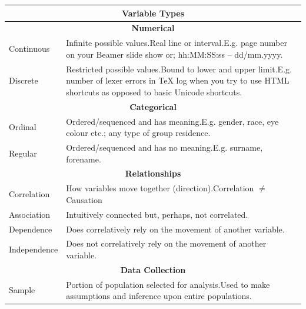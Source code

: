 \documentclass[11pt, english]{article}
\begin{document}
	\begin{center}
                \scriptsize
        \begin{longtable}{p{3cm}p{9cm}}
                \hline
                \hline
	       	\multicolumn{2}{c}{\textbf{Variable Types}}\\
                \hline
                \hline
                \multicolumn{2}{c}{\textbf{Numerical}}\\
                \hline
                Continuous & Infinite possible values.\newline Real line or interval.\newline E.g. page number on your Beamer slide show or; hh:MM:SS:ss -- dd/mm.yyyy.\\
                Discrete & Restricted possible values.\newline Bound to lower and upper limit.\newline E.g. number of lexer errors in {\TeX} log when you try to use HTML shortcuts as opposed to basic Unicode shortcuts.\\
                \hline
                \multicolumn{2}{c}{\textbf{Categorical}}\\
                \hline
                Ordinal & Ordered/sequenced and has meaning.\newline E.g. gender, race, eye colour etc.; any type of group residence.\\
                Regular & Ordered/sequenced and has no meaning.\newline E.g. surname, forename.\\
                \hline
                \multicolumn{2}{c}{\textbf{Relationships}}\\
                \hline
                Correlation & How variables move together (direction).\newline Correlation $\neq$ Causation\\
                Association & Intuitively connected but, perhaps, not correlated.\\
                Dependence & Does correlatively rely on the movement of another variable.\\
                Independence & Does not correlatively rely on the movement of another variable.\\
                \hline
                \hline
                \multicolumn{2}{c}{\textbf{Data Collection}}\\
                \hline
                \hline
                Sample & Portion of population selected for analysis.\newline Used to make assumptions and inference upon entire populations.\\

\end{longtable}
\end{center}
\end{document}
